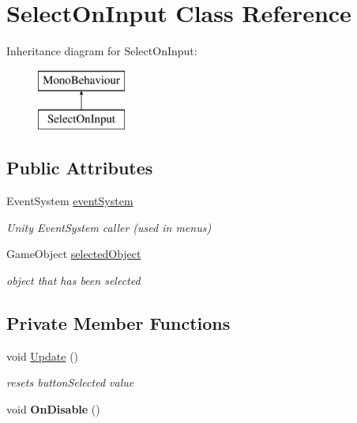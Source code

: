 \hypertarget{class_select_on_input}{}\section{Select\+On\+Input Class Reference}
\label{class_select_on_input}
Inheritance diagram for Select\+On\+Input\+:\begin{figure}[H]
\begin{center}
\leavevmode
\includegraphics[height=2.000000cm]{class_select_on_input}
\end{center}
\end{figure}
\subsection*{Public Attributes}
\begin{DoxyCompactItemize}
\item 
\mbox{\label{class_select_on_input_adf9cd7303f57e21b83a1d7f537158cc0}} 
Event\+System \hyperlink{class_select_on_input_adf9cd7303f57e21b83a1d7f537158cc0}{event\+System}
\begin{DoxyCompactList}\small\item\em Unity Event\+System caller (used in menus) \end{DoxyCompactList}\item 
\mbox{\label{class_select_on_input_a7c45b36a1cf3101337a96d6a2c18ff5c}} 
Game\+Object \hyperlink{class_select_on_input_a7c45b36a1cf3101337a96d6a2c18ff5c}{selected\+Object}
\begin{DoxyCompactList}\small\item\em object that has been selected \end{DoxyCompactList}\end{DoxyCompactItemize}
\subsection*{Private Member Functions}
\begin{DoxyCompactItemize}
\item 
\mbox{\label{class_select_on_input_a3ffd4bde4e9564050cbe707c8c75d17a}} 
void \hyperlink{class_select_on_input_a3ffd4bde4e9564050cbe707c8c75d17a}{Update} ()
\begin{DoxyCompactList}\small\item\em resets button\+Selected value \end{DoxyCompactList}\item 
\mbox{\label{class_select_on_input_a091beca3bb995b8408358b1949d526aa}} 
void {\bfseries On\+Disable} ()
\end{DoxyCompactItemize}
